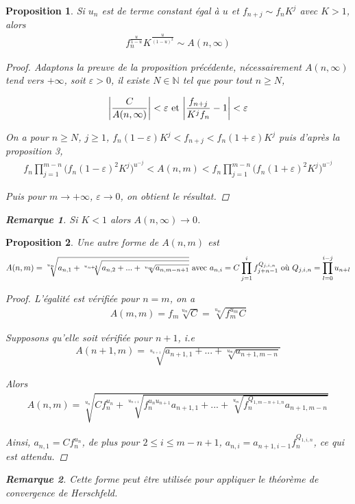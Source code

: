 \documentclass{article}
\newtheorem{prop}{Proposition}
\newtheorem*{remark}{Remarque}
\begin{document}
\begin{prop}
Si $u_n$ est de terme constant égal à $u$ et $f_{n+j}\sim f_n K^j$ avec $K>1$, alors 
\begin{align*}
f_n^{\frac{u}{1-u}} K^{\frac{u}{(1-u)^2}}\sim A(n,\infty)
\end{align*}
\begin{proof}
Adaptons la preuve de la proposition précédente, nécessairement $A(n,\infty)$ tend vers $+\infty$, soit $\varepsilon>0$, il existe $N\in\mathbb{N}$ tel que pour tout $n\geq N$,

\begin{align*}
\bigg|\frac{C}{A(n,\infty)}\bigg|<\varepsilon \textup{ et } \bigg|\frac{f_{n+j}}{K^j f_n}-1\bigg|<\varepsilon
\end{align*}

On a pour $n\geq N$, $j\geq 1$, $f_n(1-\varepsilon)K^j<f_{n+j}<f_n(1+\varepsilon)K^j$ puis d'après la proposition 3,
\begin{align*}
f_n \prod_{j=1}^{m-n}\bigg(f_n(1-\varepsilon)^2 K^j\bigg)^{u^{-j}}<A(n,m)<f_n\prod_{j=1}^{m-n}\bigg(f_n(1+\varepsilon)^2 K^j\bigg)^{u^{-j}}
\end{align*}

Puis pour $m\to +\infty$, $\varepsilon\to 0$, on obtient le résultat.
\end{proof}
\begin{remark}
Si $K<1$ alors $A(n,\infty)\to 0$.
\end{remark}
\end{prop}
\begin{prop}
Une autre forme de $A(n,m)$ est
\begin{align*}
A(n,m)=\sqrt[u_n]{a_{n,1}+\sqrt[u_{n+1}]{a_{n,2}+...+\sqrt[u_m]{a_{n,m-n+1}}}} \textup{ avec } a_{n,i} = C\prod_{j=1}^{i}{f^{Q_{j,i,n}}_{j+n-1}} \textup{ où } Q_{j,i,n} = \prod_{l = 0}^{i-j}u_{n+l}
\end{align*}
\begin{proof}
L'égalité est vérifiée pour $n=m$, on a 
\begin{align*}
A(m,m) = f_m\sqrt[u_m]{C}=\sqrt[u_m]{f_{m}^{u_m} C}
\end{align*}

Supposons qu'elle soit vérifiée pour $n+1$, i.e
\begin{align*}
A(n+1,m) = \sqrt[u_{n+1}]{a_{n+1,1}+...+\sqrt[u_m]{a_{n+1, m-n}}}
\end{align*}

Alors
\begin{align*}
A(n,m)=\sqrt[u_n]{C f_{n}^{u_n}+\sqrt[u_{n+1}]{f_{n}^{u_nu_{n+1}}a_{n+1,1}+...+\sqrt[u_m]{f_n^{Q_{1,m-n+1,n}}a_{n+1, m-n}}}}
\end{align*}

Ainsi, $a_{n,1}=C f_{n}^{u_n}$, de plus pour $2\leq i\leq m-n+1$, $a_{n,i}=a_{n+1,i-1}f_{n}^{Q_{1,i,n}}$, ce qui est attendu.
\end{proof}
\begin{remark}
Cette forme peut être utilisée pour appliquer le théorème de convergence de Herschfeld.
\end{remark}
\end{prop}
\end{document}

